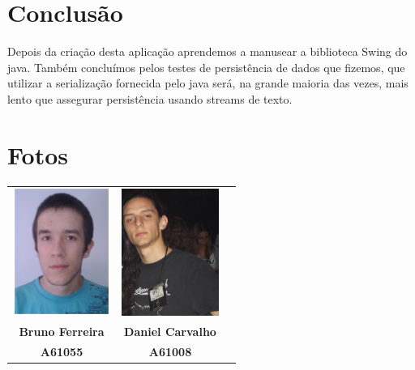 \documentclass[a5paper,twocolumn, 11pt]{article}
\begin{document}
\newpage
\twocolumn

\clearpage
\section{Conclusão}
Depois da criação desta aplicação aprendemos a manusear a biblioteca Swing do java.
Também concluímos pelos testes de persistência de dados que fizemos, que utilizar a serialização fornecida pelo java será, na grande maioria das vezes, mais lento que assegurar persistência usando streams de texto.


\clearpage
\onecolumn
\section{Fotos}
\begin{center}
    \begin{tabular}{ccc}
        \includegraphics[width=90pt]{bruno.png}&
        \includegraphics[width=90pt]{daniel.png}\\
        
        \small{\textbf{Bruno Ferreira}}&
        \small{\textbf{Daniel Carvalho}}\\
        \small{\textbf{A61055}}&
        \small{\textbf{A61008}}\\
    \end{tabular}
\end{center}
\end{document}

